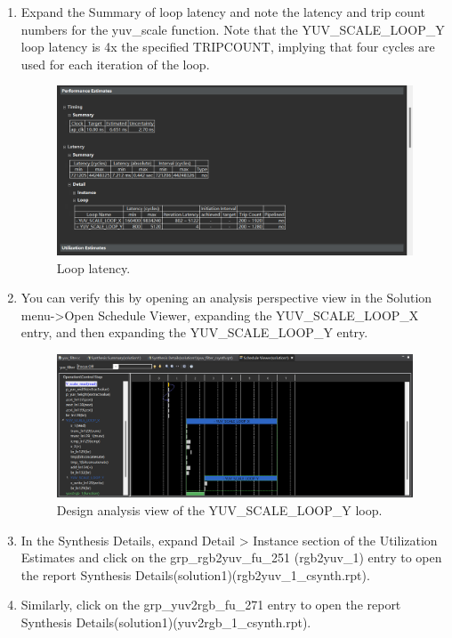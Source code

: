 \documentclass[a4paper,12pt,twoside]{article}
\begin{document}
\begin{enumerate}
    \item Expand the Summary of loop latency and note the latency and trip count numbers for the yuv\_scale function. Note that the YUV\_SCALE\_LOOP\_Y loop latency is 4x the specified TRIPCOUNT, implying that four cycles are used for each iteration of the loop.
    \begin{figure}[H]
        \centering
        \includegraphics[width=\textwidth]{images/3.png}
        \caption{Loop latency.}
    \end{figure}
    \item You can verify this by opening an analysis perspective view in the Solution menu->Open Schedule Viewer, expanding the YUV\_SCALE\_LOOP\_X entry, and then expanding the YUV\_SCALE\_LOOP\_Y entry.
    \begin{figure}[H]
        \centering
        \includegraphics[width=\textwidth]{images/4.png}
        \caption{Design analysis view of the YUV\_SCALE\_LOOP\_Y loop.}
    \end{figure}
    \item In the Synthesis Details, expand Detail > Instance section of the Utilization Estimates and click on the grp\_rgb2yuv\_fu\_251 (rgb2yuv\_1) entry to open the report Synthesis Details(solution1)(rgb2yuv\_1\_csynth.rpt).
    \item Similarly, click on the grp\_yuv2rgb\_fu\_271 entry to open the report Synthesis Details(solution1)(yuv2rgb\_1\_csynth.rpt).

\end{enumerate}
\end{document}
